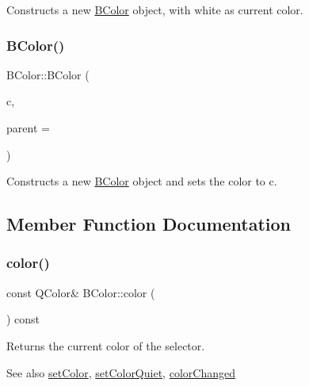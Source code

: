 Constructs a new \hyperlink{class_b_color}{B\+Color} object, with white as current color. \hypertarget{class_b_color_ae4773993aef804d6019d8216647555db}{}\label{class_b_color_ae4773993aef804d6019d8216647555db} 
\subsubsection{\texorpdfstring{B\+Color()}{BColor()}\hspace{0.1cm}{\footnotesize\ttfamily [2/2]}}
{\footnotesize\ttfamily B\+Color\+::\+B\+Color (\begin{DoxyParamCaption}\item[{Q\+Color}]{c,  }\item[{Q\+Widget $\ast$}]{parent = {} }\end{DoxyParamCaption})\hspace{0.3cm}{\ttfamily [explicit]}}

Constructs a new \hyperlink{class_b_color}{B\+Color} object and sets the color to c. 

\subsection{Member Function Documentation}
\hypertarget{class_b_color_ab9a9f1cb29c1894b5dc9c563a9256c3b}{}\label{class_b_color_ab9a9f1cb29c1894b5dc9c563a9256c3b} 
\subsubsection{\texorpdfstring{color()}{color()}}
{\footnotesize\ttfamily const Q\+Color\& B\+Color\+::color (\begin{DoxyParamCaption}{ }\end{DoxyParamCaption}) const}

Returns the current color of the selector.

\begin{DoxySeeAlso}{See also}
\hyperlink{class_b_color_a901e6704aef22f6db97d3578e14777c6}{set\+Color}, \hyperlink{class_b_color_a3781c2b986f19ceaac7c994767015b56}{set\+Color\+Quiet}, \hyperlink{class_b_color_a75ac94fde91e10eb6c27242f608b8d62}{color\+Changed} 
\end{DoxySeeAlso}
\hypertarget{class_b_color_a75ac94fde91e10eb6c27242f608b8d62}{}\label{class_b_color_a75ac94fde91e10eb6c27242f608b8d62} 
